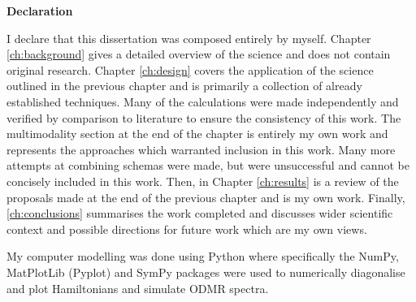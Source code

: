 \begin{center}
\textrm{\bfseries\Huge Declaration}%
\end{center}%
\vspace{1em}

I declare that this dissertation was composed entirely by myself. Chapter \ref{ch:background} gives a detailed overview of the science and does not contain original research. Chapter \ref{ch:design} covers the application of the science outlined in the previous chapter and is primarily a collection of already established techniques. Many of the calculations were made independently and verified by comparison to literature to ensure the consistency of this work. The multimodality section at the end of the chapter is entirely my own work and represents the approaches which warranted inclusion in this work. Many more attempts at combining schemas were made, but were unsuccessful and cannot be concisely included in this work. 
Then, in Chapter \ref{ch:results} is a review of the proposals made at the end of the previous chapter and is my own work.
Finally, \ref{ch:conclusions} summarises the work completed and discusses wider scientific context and possible directions for  
future work which are my own views. 

My computer modelling was done using Python where specifically the NumPy, MatPlotLib (Pyplot) and SymPy packages were used to numerically diagonalise and plot Hamiltonians and simulate ODMR spectra.  

%
%
%
%
%
%
\vspace*{\fill}
\newpage
%
%
